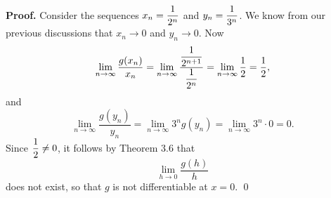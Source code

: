 \begin{enumerate}
\begin{enumerate}
               \textbf{Proof.} Consider the sequences $\displaystyle x_n = \frac{1}{2^n}$ 
               and $\displaystyle y_n = \frac{1}{3^n}$. We know from our previous 
               discussions that $x_n \rightarrow 0$ and $y_n \rightarrow 0$.
               Now
               $$\lim_{n \to \infty}\frac{g(x_n)}{x_n} = \lim_{n \to \infty}
                 \frac{\displaystyle\frac{1}{2^{n+1}}}{\displaystyle\frac{1}{2^n}} =
                 \lim_{n \to \infty}\frac{1}{2} = \frac{1}{2},$$
               and
               $$\lim_{n \to \infty}\frac{g(y_n)}{y_n} = \lim_{n \to \infty}
                  3^ng(y_n) = \lim_{n \to \infty} 3^n \cdot 0 = 0.$$
               Since $\displaystyle\frac{1}{2} \neq 0$, it follows by Theorem 3.6 that
               $$\lim_{h \to 0}\frac{g(h)}{h}$$
               does not exist, so that $g$ is not differentiable at $x = 0$.
               \qed    
      \end{enumerate}
\end{enumerate}
